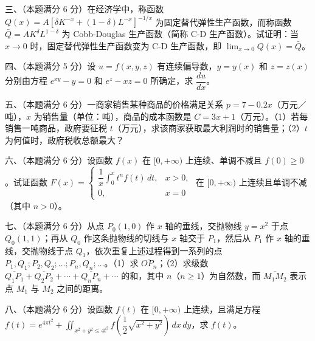 \documentclass[UTF8,12pt]{ctexart}
\begin{document}
三、（本题满分 6 分）在经济学中，称函数 \(\displaystyle Q(x)=A[\delta K^{-x}+(1-\delta)L^{-x}]^{-1/x}\) 为固定替代弹性生产函数，而称函数 \(\displaystyle \bar Q=AK^\delta L^{1-\delta}\) 为 Cobb-Douglas 生产函数（简称 C-D 生产函数）。试证明：当 \(\displaystyle x\to0\) 时，固定替代弹性生产函数变为 C-D 生产函数，即 \(\displaystyle \lim_{x\to0}Q(x)=\bar Q\)。


四、（本题满分 5 分）设 \(\displaystyle u=f(x,\allowbreak y,\allowbreak z)\) 有连续偏导数，\(\displaystyle y=y(x)\) 和 \(\displaystyle z=z(x)\) 分别由方程 \(\displaystyle e^{xy}-y=0\) 和 \(\displaystyle e^z-xz=0\) 所确定，求 \(\displaystyle \dfrac{\displaystyle du}{\displaystyle dx}\)。


五、（本题满分 6 分）一商家销售某种商品的价格满足关系 \(\displaystyle p=7-0.2x\)（万元／吨），\(\displaystyle x\) 为销售量（单位：吨），商品的成本函数是 \(\displaystyle C=3x+1\)（万元）。（1）若每销售一吨商品，政府要征税 \(\displaystyle t\)（万元），求该商家获取最大利润时的销售量；（2）\(\displaystyle t\) 为何值时，政府税收总额最大？


六、（本题满分 6 分）设函数 \(\displaystyle f(x)\) 在 \(\displaystyle [0,\allowbreak +\infty)\) 上连续、单调不减且 \(\displaystyle f(0)\geq0\)。试证函数 \(\displaystyle F(x)=\begin{cases}\dfrac{\displaystyle 1}{\displaystyle x}\displaystyle \int_0^x t^nf(t)\,dt,\allowbreak &x>0,\allowbreak \\0,\allowbreak &x=0\end{cases}\) 在 \(\displaystyle [0,\allowbreak +\infty)\) 上连续且单调不减（其中 \(\displaystyle n>0\)）。


七、（本题满分 6 分）从点 \(\displaystyle P_0(1,\allowbreak 0)\) 作 \(\displaystyle x\) 轴的垂线，交抛物线 \(\displaystyle y=x^2\) 于点 \(\displaystyle Q_0(1,\allowbreak 1)\)；再从 \(\displaystyle Q_0\) 作这条抛物线的切线与 \(\displaystyle x\) 轴交于 \(\displaystyle P_1\)，然后从 \(\displaystyle P_1\) 作 \(\displaystyle x\) 轴的垂线，交抛物线于点 \(\displaystyle Q_1\)，依次重复上述过程得到一系列的点 \(\displaystyle P_1,\allowbreak Q_1;P_2,\allowbreak Q_2;\ldots;P_n,\allowbreak Q_n;\ldots\)。（1）求 \(\displaystyle \overline{OP_n}\)；（2）求级数 \(\displaystyle \overline{Q_1P_1}+\overline{Q_2P_2}+\cdots+\overline{Q_nP_n}+\cdots\) 的和，其中 \(\displaystyle n\)（\(\displaystyle n\geq1\)）为自然数，而 \(\displaystyle \overline{M_1M_2}\) 表示点 \(\displaystyle M_1\) 与 \(\displaystyle M_2\) 之间的距离。


八、（本题满分 6 分）设函数 \(\displaystyle f(t)\) 在 \(\displaystyle [0,\allowbreak +\infty)\) 上连续，且满足方程 \(\displaystyle f(t)=e^{4\pi t^2}+\displaystyle \iint_{x^2+y^2\leq4t^2}f\left(\dfrac{\displaystyle 1}{\displaystyle 2}\sqrt{x^2+y^2}\right)\,dx\,dy\)，求 \(\displaystyle f(t)\)。
\end{document}
